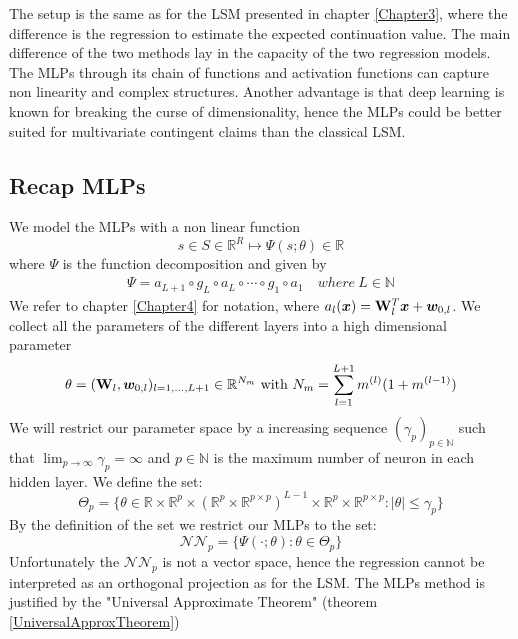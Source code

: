 The setup is the same as for the LSM presented in chapter \ref{Chapter3}, where the difference is the regression to estimate the expected continuation value. The main difference of the two methods lay in the capacity of the two regression models. The MLPs through its chain of functions and activation functions can capture non linearity and complex structures. Another advantage is that deep learning is known for breaking the curse of dimensionality, hence the MLPs could be better suited for multivariate contingent claims than the classical LSM.

\subsection{Recap MLPs}
We model the MLPs with a non linear function 
$$s \in S \in \mathbb{R}^R \mapsto \Psi(s;\theta) \in \mathbb{R}$$
where $\Psi$ is the function decomposition and given by
\begin{align*}
\Psi = a_{L+1} \circ g_L \circ a_{L} \circ \cdots \circ g_1 \circ a_1 \quad where \ L\in \mathbb{N}
\end{align*}
We refer to chapter \ref{Chapter4} for notation, where $a_l(\bm{x})=\mathbf{W}_l^T \bm{x} + \bm{w}_{0,l}$. We collect all the parameters of the different layers into a high dimensional parameter
$$\theta=(\mathbf{W}_l, \bm{w}_{0,l})_{l=1,\ldots,L+1} \in \mathbb{R}^{N_m} \text{ with } N_m=\sum_{l=1}^{L+1} m^{(l)} (1+ m^{(l-1)})$$
We will restrict our parameter space by a increasing sequence $(\gamma_p)_{p\in \mathbb{N}}$ such that $\lim_{p\to \infty} \gamma_p=\infty$ and $p\in \mathbb{N}$ is the maximum number of neuron in each hidden layer. We define the set:
$$\Theta_p = \{ \theta \in \mathbb{R} \times \mathbb{R}^p \times (\mathbb{R}^p \times \mathbb{R}^{p \times p})^{L-1} \times \mathbb{R}^{p} \times \mathbb{R}^{p \times p} : |\theta| \leq \gamma_p \}$$
By the definition of the set we restrict our MLPs to the set:
$$\mathcal{N} \mathcal{N}_p= \{ \Psi(\cdot;\theta) : \theta \in \Theta_p \}$$
Unfortunately the $\mathcal{N} \mathcal{N}_p$ is not a vector space, hence the regression cannot be interpreted as an orthogonal projection as for the LSM. The MLPs method is justified by the "Universal Approximate Theorem" (theorem \ref{UniversalApproxTheorem})

